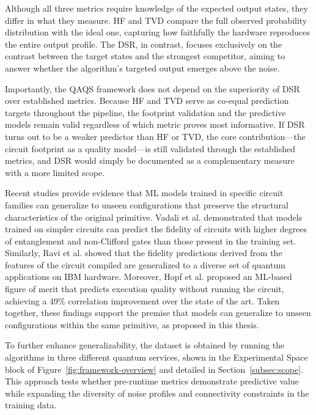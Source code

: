 \documentclass{article}
\begin{document}
Although all three metrics require knowledge of the expected output states, they differ in what they measure. HF and TVD compare the full observed probability distribution with the ideal one, capturing how faithfully the hardware reproduces the entire output profile. The DSR, in contrast, focuses exclusively on the contrast between the target states and the strongest competitor, aiming to answer whether the algorithm's targeted output emerges above the noise.

Importantly, the QAQS framework does not depend on the superiority of DSR over established metrics. Because HF and TVD serve as co-equal prediction targets throughout the pipeline, the footprint validation and the predictive models remain valid regardless of which metric proves most informative. If DSR turns out to be a weaker predictor than HF or TVD, the core contribution---the circuit footprint as a quality model---is still validated through the established metrics, and DSR would simply be documented as a complementary measure with a more limited scope.

Recent studies provide evidence that ML models trained in specific circuit families can generalize to unseen configurations that preserve the structural characteristics of the original primitive. Vadali et al. \cite{vadaliQuantumCircuitFidelity_2024} demonstrated that models trained on simpler circuits can predict the fidelity of circuits with higher degrees of entanglement and non-Clifford gates than those present in the training set. Similarly, Ravi et al. \cite{raviAdaptiveJobResource_2021} showed that the fidelity predictions derived from the features of the circuit compiled are generalized to a diverse set of quantum applications on IBM hardware. Moreover, Hopf et al. \cite{hopfImprovingFiguresMerit_2025} proposed an ML-based figure of merit that predicts execution quality without running the circuit, achieving a 49\% correlation improvement over the state of the art. Taken together, these findings support the premise that models can generalize to unseen configurations within the same primitive, as proposed in this thesis.

To further enhance generalizability, the dataset is obtained by running the algorithms in three different quantum services, shown in the Experimental Space block of Figure~\ref{fig:framework-overview} and detailed in Section~\ref{subsec:scope}. This approach tests whether pre-runtime metrics demonstrate predictive value while expanding the diversity of noise profiles and connectivity constraints in the training data.
\end{document}

